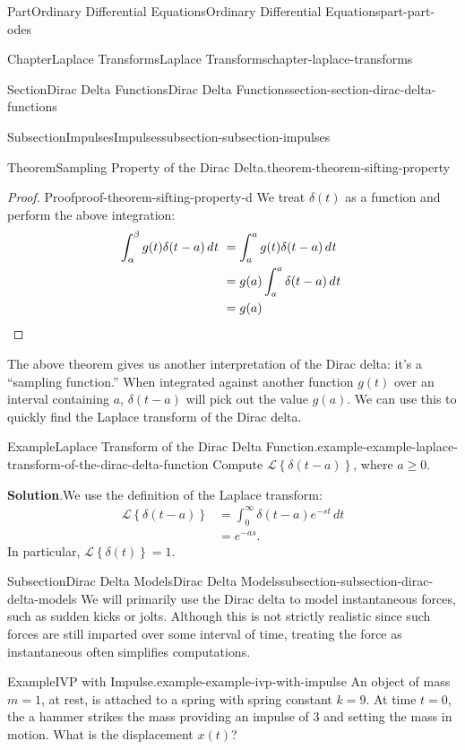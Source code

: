 \documentclass[twoside,10pt,]{book}
\newcommand{\blocktitlefont}{\relax}
\numberwithin{equation}{part}
\newcommand{\qedhere}{\relax}
\newcommand{\Laplace}[1]{\mathcal{L}\set{#1}}
\newcommand{\dd}[2][]{\, d^{#1} #2\ }
\newcommand{\set}[1]{\left\{ #1 \right\}}
\begin{document}
\begin{partptx}{Part}{Ordinary Differential Equations}{}{Ordinary Differential Equations}{}{}{part-part-odes}
\begin{chapterptx}{Chapter}{Laplace Transforms}{}{Laplace Transforms}{}{}{chapter-laplace-transforms}
\begin{sectionptx}{Section}{Dirac Delta Functions}{}{Dirac Delta Functions}{}{}{section-section-dirac-delta-functions}
\begin{subsectionptx}{Subsection}{Impulses}{}{Impulses}{}{}{subsection-subsection-impulses}
\begin{theorem}{Theorem}{Sampling Property of the Dirac Delta.}{}{theorem-theorem-sifting-property}
%
\end{theorem}
\begin{proof}{Proof}{}{proof-theorem-sifting-property-d}
We treat \(\delta(t)\) as a function and perform the above integration:%
\begin{align*}
\int_{\alpha}^{\beta}g(t)\delta(t-a)\dd{t} &= \int_{a}^{a}g(t)\delta(t-a)\dd{t}\\
&= g(a)\int_{a}^{a}\delta(t-a)\dd{t}\\
&= g(a)\qedhere
\end{align*}
%
\end{proof}
The above theorem gives us another interpretation of the Dirac delta: it's a ``sampling function.'' When integrated against another function \(g(t)\) over an interval containing \(a\), \(\delta(t-a)\) will pick out the value \(g(a)\). We can use this to quickly find the Laplace transform of the Dirac delta.%
\begin{example}{Example}{Laplace Transform of the Dirac Delta Function.}{example-example-laplace-transform-of-the-dirac-delta-function}%
Compute \(\Laplace{\delta(t-a)}\), where \(a\geq0\).%
\par\smallskip%
\noindent\textbf{\blocktitlefont Solution}.\hypertarget{solution-example-laplace-transform-of-the-dirac-delta-function-c}{}\quad{}We use the definition of the Laplace transform:%
\begin{align*}
\Laplace{\delta(t-a)} &= \int_{0}^{\infty}\delta(t-a)e^{-st}\,dt\\
&= e^{-as}\text{.}
\end{align*}
In particular, \(\Laplace{\delta(t)} = 1\).%
\end{example}
\end{subsectionptx}
%
%
\typeout{************************************************}
\typeout{************************************************}
%
\begin{subsectionptx}{Subsection}{Dirac Delta Models}{}{Dirac Delta Models}{}{}{subsection-subsection-dirac-delta-models}
We will primarily use the Dirac delta to model instantaneous forces, such as sudden kicks or jolts. Although this is not strictly realistic since such forces are still imparted over some interval of time, treating the force as instantaneous often simplifies computations.%
\begin{example}{Example}{IVP with Impulse.}{example-example-ivp-with-impulse}%
An object of mass \(m=1\), at rest, is attached to a spring with spring constant \(k=9\). At time \(t=0\), the a hammer strikes the mass providing an impulse of \(3\) and setting the mass in motion. What is the displacement \(x(t)\)?%

\end{example}
\end{subsectionptx}
\end{sectionptx}
\end{chapterptx}
\end{partptx}
\end{document}
